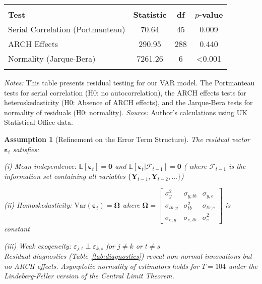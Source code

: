 \documentclass[
]{article}
\let\oldtable\table
\let\endoldtable\endtable
\renewenvironment{table}[1][H]{\oldtable[H]}{\endoldtable}
\newtheorem{assumption}{Assumption} %
\begin{document}
	\begin{table}[!htbp]
		\centering
		\caption{\textsc{Residual Diagnostic Tests}}
		\label{tab:diagnostics}
		\small
		\begin{tabular}{@{}lSSS@{}}
			\\  \hline \hline \\
			\textbf{Test} & \textbf{Statistic} & \textbf{df} & \textbf{$p$-value} \\ 
			\midrule
			Serial Correlation (Portmanteau) & 70.64 & 45 & 0.009 \\
			ARCH Effects & 290.95 & 288 & 0.440 \\
			Normality (Jarque-Bera) & 7261.26 & 6 & <0.001 \\
			\hline \hline  \\
		\end{tabular}
			\begin{minipage}{\textwidth}
			\footnotesize
			\textit{Notes:} This table presents residual testing for our VAR model. The Portmanteau tests for serial correlation (H0: no autocorrelation),
			the ARCH effects tests for heteroskedasticity (H0: Absence of ARCH effects), and the Jarque-Bera tests for normality of residuals (H0: normality).
			\textit{Source:} Author's calculations using UK Statistical Office data.
		\end{minipage}
	\end{table}
	
	\begin{assumption}[Refinement on the Error Term Structure]\label{assump:errors}
		The residual vector $\bm{\varepsilon}_t$ satisfies: 
		
		(i) Mean independence: $\mathbb{E}[\bm{\varepsilon}_t] = 
		\bm{0}$ and $\mathbb{E}[\bm{\varepsilon}_t|\mathcal{F}_{t-1}] = \bm{0}$ ( where 
		$\mathcal{F}_{t-1}$ is the information set containing all variables $\{\bm{Y}_{t-1}, \bm{Y}_{t-2}, \dots\}$)
		
		(ii) Homoskedasticity: $\text{Var}(\bm{\varepsilon}_t) = \bm{\Omega}$ where 
		$\bm{\Omega} = \begin{bmatrix}
			\sigma^2_y & \sigma_{y,tb} & \sigma_{y,e} \\
			\sigma_{tb,y} & \sigma^2_{tb} & \sigma_{tb,e} \\
			\sigma_{e,y} & \sigma_{e,tb} & \sigma^2_e
		\end{bmatrix}$ is constant 
		
		(iii) Weak exogeneity: $\varepsilon_{j,t} \perp \varepsilon_{k,s}$ for $j \neq k$ or $t \neq s$ \\
		Residual diagnostics (Table~\ref{tab:diagnostics}) reveal non-normal innovations but no ARCH effects.
		Asymptotic normality of estimators holds for $T=104$ under the Lindeberg-Feller version of the Central Limit Theorem.
	\end{assumption}
	
\end{document}

